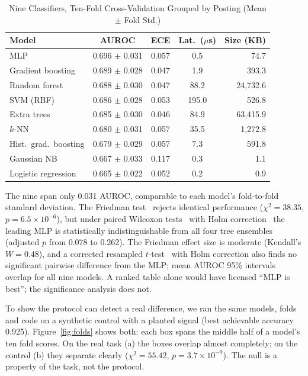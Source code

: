 \documentclass[conference,a4paper]{IEEEtran}
\begin{document}
\begin{table}[t]
\caption{Nine Classifiers, Ten-Fold Cross-Validation Grouped by Posting
(Mean $\pm$ Fold Std.)}
\label{tab:nine}
\centering
\footnotesize
\setlength{\tabcolsep}{4pt}
\begin{tabular}{@{}lcccr@{}}
\toprule
Model & AUROC & ECE & Lat.\ ($\mu$s) & Size (KB) \\
\midrule
MLP                 & 0.696 $\pm$ 0.031 & 0.057 & 0.5   & 74.7 \\
Gradient boosting   & 0.689 $\pm$ 0.028 & 0.047 & 1.9   & 393.3 \\
Random forest       & 0.688 $\pm$ 0.030 & 0.047 & 88.2  & 24,732.6 \\
SVM (RBF)           & 0.686 $\pm$ 0.028 & 0.053 & 195.0 & 526.8 \\
Extra trees         & 0.685 $\pm$ 0.030 & 0.046 & 84.9  & 63,415.9 \\
$k$-NN              & 0.680 $\pm$ 0.031 & 0.057 & 35.5  & 1,272.8 \\
Hist.\ grad.\ boosting & 0.679 $\pm$ 0.029 & 0.057 & 7.3 & 591.8 \\
Gaussian NB         & 0.667 $\pm$ 0.033 & 0.117 & 0.3   & 1.1 \\
Logistic regression & 0.665 $\pm$ 0.022 & 0.052 & 0.2   & 0.9 \\
\bottomrule
\end{tabular}
\end{table}

The nine span only 0.031 AUROC, comparable to each model's fold-to-fold
standard deviation. The Friedman test~\cite{friedman1937} rejects identical
performance ($\chi^2 = 38.35$, $p = 6.5\times10^{-6}$), but under paired
Wilcoxon tests~\cite{wilcoxon1945} with Holm correction~\cite{holm1979} the
leading MLP is statistically indistinguishable from all four tree ensembles
(adjusted $p$ from 0.078 to 0.262). The Friedman effect size is moderate
(Kendall's $W = 0.48$), and a corrected resampled $t$-test~\cite{nadeau2003}
with Holm correction also finds no significant pairwise difference from the
MLP; mean AUROC 95\% intervals overlap for all nine models. A ranked table alone would have licensed
``MLP is best''; the significance analysis does not.

To show the protocol can detect a real difference, we ran the same models,
folds and code on a synthetic control with a planted signal (best achievable
accuracy 0.925). Figure~\ref{fig:folds} shows both: each box spans the middle
half of a model's ten fold scores. On the real task (a) the boxes overlap
almost completely; on the control (b) they separate clearly ($\chi^2 = 55.42$, $p = 3.7\times10^{-9}$). The null is a property of
the task, not the protocol.
\end{document}
